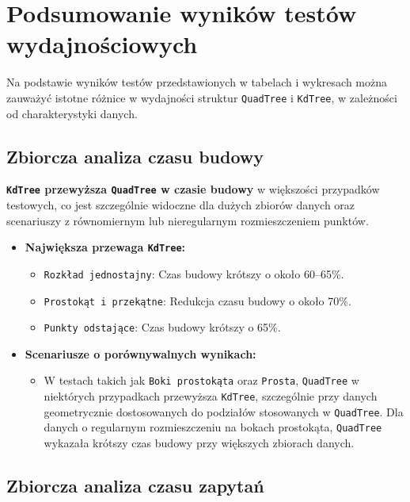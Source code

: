 \documentclass[12pt]{article}
\begin{document}
\newpage
\section{Podsumowanie wyników testów wydajnościowych}
Na podstawie wyników testów przedstawionych w tabelach i wykresach można zauważyć istotne różnice w wydajności struktur \texttt{QuadTree} i \texttt{KdTree}, w zależności od charakterystyki danych.

\subsection{Zbiorcza analiza czasu budowy}

\noindent \textbf{\texttt{KdTree} przewyższa \texttt{QuadTree} w czasie budowy} w większości przypadków testowych, co jest szczególnie widoczne dla dużych zbiorów danych oraz scenariuszy z równomiernym lub nieregularnym rozmieszczeniem punktów. 

\begin{itemize}
    \item \textbf{Największa przewaga \texttt{KdTree}:}
    \begin{itemize}
        \item \texttt{Rozkład jednostajny}: Czas budowy krótszy o około 60–65\%.
        \item \texttt{Prostokąt i przekątne}: Redukcja czasu budowy o około 70\%.
        \item \texttt{Punkty odstające}: Czas budowy krótszy o 65\%.
    \end{itemize}
    
    \item \textbf{Scenariusze o porównywalnych wynikach:}
    \begin{itemize}
        \item W testach takich jak \texttt{Boki prostokąta} oraz \texttt{Prosta}, \texttt{QuadTree} w niektórych przypadkach przewyższa \texttt{KdTree}, szczególnie przy danych geometrycznie dostosowanych do podziałów stosowanych w \texttt{QuadTree}. Dla danych o regularnym rozmieszczeniu na bokach prostokąta, \texttt{QuadTree} wykazała krótszy czas budowy przy większych zbiorach danych.
    \end{itemize}
\end{itemize}

\subsection{Zbiorcza analiza czasu zapytań}
\end{document}
